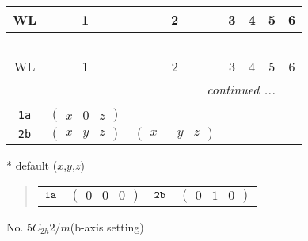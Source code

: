 \documentclass[fleqn,9pt,landscape]{jsarticle}
\begin{document}
\begin{center}
\renewcommand{\arraystretch}{1.2}
\begin{longtable}{ccccccc}
 \hline \hline
WL & 1 & 2 & 3 & 4 & 5 & 6 \\ \hline \endfirsthead

\multicolumn{6}{l}{\tablename\ \thetable{}} \\
 \hline \hline
WL & 1 & 2 & 3 & 4 & 5 & 6 \\ \hline \endhead

 \hline \hline
\multicolumn{6}{r}{\footnotesize\it continued ...} \\ \endfoot

 \hline \hline
\multicolumn{6}{r}{} \\ \endlastfoot

{\tt 1a} & $ \begin{pmatrix} x & 0 & z \end{pmatrix} $ & $  $ \\ \hline
{\tt 2b} & $ \begin{pmatrix} x & y & z \end{pmatrix} $ & $ \begin{pmatrix} x & - y & z \end{pmatrix} $ \\
\end{longtable}
\end{center}
* default ($x$,$y$,$z$)
\begin{quote}
\begin{tabular}{cccc}
$ {\tt 1a} $ & $ \begin{pmatrix} 0 & 0 & 0 \end{pmatrix} $ & $ {\tt 2b} $ & $ \begin{pmatrix} 0 & 1 & 0 \end{pmatrix} $
\end{tabular}
\end{quote}
\newpage
No. 5\quad$C_{2h}$\quad$2/m$\quad(b-axis setting)\quad[ monoclinic ]
\end{document}

